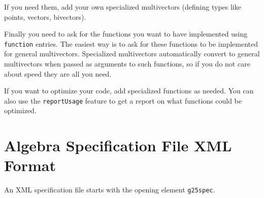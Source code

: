 \documentclass[10pt, a4paper]{article}
\begin{document}
If you need them, add your own specialized multivectors (defining types like points,
vectors, bivectors). 

Finally you need to ask for the functions you want to have implemented using {\tt function} entries.
The easiest way is to ask for these functions to be implemented for general multivectors.
Specialized multivectors automatically convert to general multivectors when passed
as arguments to such functions, so if you do not care about speed they are all you need.

If you want to optimize your code, add specialized functions as needed. You can
also use the {\tt reportUsage} feature to get a report on what functions could be
optimized.

\section{Algebra Specification File XML Format}

An XML specification file starts with the opening element {\tt g25spec}.
\end{document}

